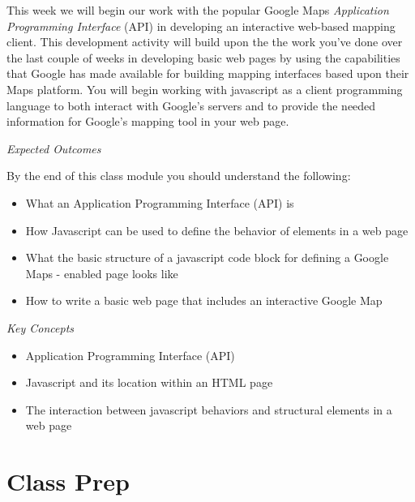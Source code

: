 \documentclass[]{book}
\begin{document}
This week we will begin our work with the popular Google Maps
\emph{Application Programming Interface} (API) in developing an
interactive web-based mapping client. This development activity will
build upon the the work you've done over the last couple of weeks in
developing basic web pages by using the capabilities that Google has
made available for building mapping interfaces based upon their Maps
platform. You will begin working with javascript as a client programming
language to both interact with Google's servers and to provide the
needed information for Google's mapping tool in your web page.

\emph{Expected Outcomes}

By the end of this class module you should understand the following:

\begin{itemize}
\item
  What an Application Programming Interface (API) is
\item
  How Javascript can be used to define the behavior of elements in a web
  page
\item
  What the basic structure of a javascript code block for defining a
  Google Maps - enabled page looks like
\item
  How to write a basic web page that includes an interactive Google Map
\end{itemize}

\emph{Key Concepts}

\begin{itemize}
\item
  Application Programming Interface (API)
\item
  Javascript and its location within an HTML page
\item
  The interaction between javascript behaviors and structural elements
  in a web page
\end{itemize}

\section{Class Prep}\label{week03-prep}
\end{document}
